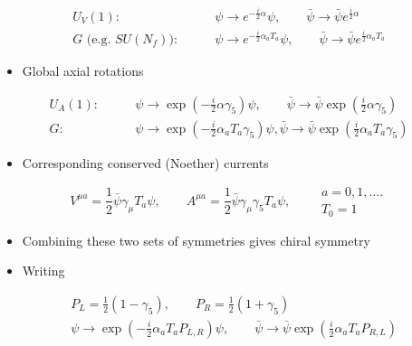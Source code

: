 \begin{equation}
\begin{aligned}
U_V(1) : \qquad & \psi \rightarrow e^{-\frac{i}{2} \alpha} \psi, \qquad \bar{\psi} \rightarrow \bar{\psi} e^{\frac{i}{2} \alpha}  \\
G\text{ (e.g. }SU(N_f)): \qquad & \psi \rightarrow e^{-\frac{i}{2} \alpha_{a} T_{a}}\psi, \qquad \bar{\psi} \rightarrow \bar{\psi} e^{\frac{i}{2} \alpha_{a} T_{a}}  
\end{aligned}
\end{equation}
\begin{itemize}
    \item Global axial rotations
\end{itemize}
\begin{equation}
\begin{aligned}
U_{A}(1) : \qquad & \psi \rightarrow \exp \left(-\frac{i}{2} \alpha \gamma_{5}\right) \psi,\qquad  \bar{\psi} \rightarrow \bar{\psi} \exp \left(\frac{i}{2} \alpha \gamma_{5}\right) \\
G : \qquad& \psi \rightarrow \exp \left(-\frac{i}{2} \alpha_{a} T_{a} \gamma_{5}\right) \psi, \bar{\psi} \rightarrow \bar{\psi} \exp \left(\frac{i}{2} \alpha_{a} T_{a} \gamma_{5}\right) 
\end{aligned}
\end{equation}

\begin{itemize}
  \item Corresponding conserved (Noether) currents
\end{itemize}
\begin{equation}
V^{\mu a}=\frac{1}{2} \bar{\psi} \gamma_{\mu} T_{a} \psi, \qquad A^{\mu a}=\frac{1}{2} \bar{\psi} \gamma_{\mu} \gamma_{5} T_{a} \psi, \qquad \begin{gathered}
a=0,1, \ldots . \\
T_{0}=1
\end{gathered}
\end{equation}

\begin{itemize}
  \item Combining these two sets of symmetries gives chiral symmetry
  \item Writing
\end{itemize}

\begin{equation}
\begin{aligned}
& P_{L}=\frac{1}{2}\left(1-\gamma_{5}\right), \qquad P_{R}=\frac{1}{2}\left(1+\gamma_{5}\right) \\
& \psi \rightarrow \exp \left(-\frac{i}{2} \alpha_{a} T_{a} P_{L, R}\right) \psi, \qquad \bar{\psi} \rightarrow \bar{\psi} \exp \left(\frac{i}{2} \alpha_{a} T_{a} P_{R, L}\right)
\end{aligned}
\end{equation}

